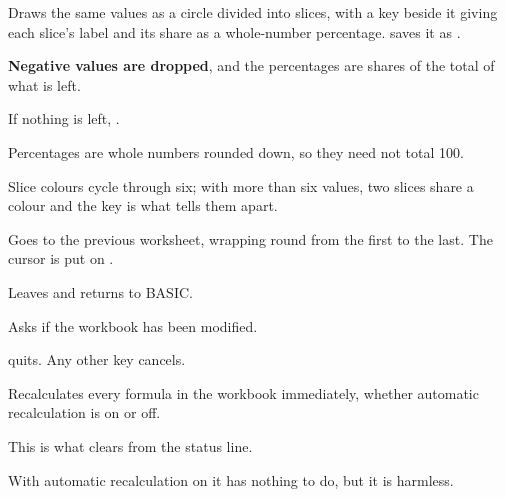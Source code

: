 
Draws the same values as a circle divided into slices, with a key beside it
giving each slice's label and its share as a whole-number percentage. 
saves it as .

\begin{ccsteps}
\item \textbf{Negative values are dropped}, and the percentages are shares of
the total of what is left.
\item If nothing is left, .
\item Percentages are whole numbers rounded down, so they need not total 100.
\item Slice colours cycle through six; with more than six values, two slices
share a colour and the key is what tells them apart.
\end{ccsteps}


Goes to the previous worksheet, wrapping round from the first to the last. The
cursor is put on .


Leaves \ccprod{} and returns to BASIC.

\begin{ccsteps}
\item Asks  if the workbook has been modified.
\item {} quits. Any other key cancels.
\end{ccsteps}


Recalculates every formula in the workbook immediately, whether automatic
recalculation is on or off.

\begin{ccsteps}
\item This is what clears  from the status line.
\item With automatic recalculation on it has nothing to do, but it is harmless.
\end{ccsteps}


